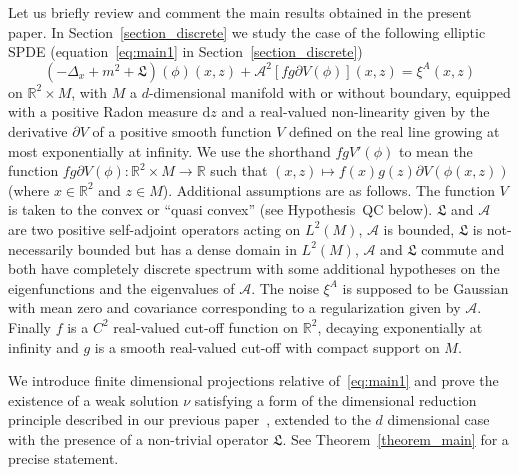 \documentclass[a4paper,10pt]{article}
\newcommand{\mathd}{\mathrm{d}}
\begin{document}
Let us briefly review and comment the main results obtained in the present
paper. In Section~\ref{section_discrete} we study the case of the following
elliptic SPDE (equation~{\eqref{eq:main1}} in Section~\ref{section_discrete})
\[ (- \Delta_x + m^2 + \mathfrak{L}) (\phi) (x, z) + \mathcal{A}^2 [f g
   \partial V (\phi)] (x, z) = \xi^A (x, z) \]
on $\mathbb{R}^2 \times M$, with $M$ a $d$-dimensional manifold with or
without boundary, equipped with a positive Radon measure $\mathd z$ and a
real-valued non-linearity given by the derivative $\partial V$ of a positive smooth
function $V$ defined on the real line growing at most exponentially at
infinity. We use the shorthand $f g V'(\phi)$ to mean the function $f g \partial V(\phi): \mathbb{R}^2\times M  \longrightarrow  \mathbb{R}$ such that $ (x, z) \longmapsto f (x) g (z) \partial V
(\phi (x, z)) $ (where $x\in \mathbb{R}^2$ and $z\in M$).
%
 Additional assumptions are as follows. The function $V$ is
taken to the convex or ``quasi convex'' (see Hypothesis~QC below).
$\mathfrak{L}$ and $\mathcal{A}$ are two positive self-adjoint operators
acting on $L^2 (M)$, $\mathcal{A}$ is bounded, $\mathfrak{L}$ is
not-necessarily bounded but has a dense domain in $L^2 (M)$, $\mathcal{A}$ and
$\mathfrak{L}$ commute and both have completely discrete spectrum with some
additional hypotheses on the eigenfunctions and the eigenvalues of
$\mathcal{A}$. The noise $\xi^A$ is supposed to be Gaussian with mean zero and
covariance corresponding to a regularization given by $\mathcal{A}$. Finally
$f$ is a $C^2$ real-valued cut-off function on $\mathbb{R}^2$, decaying
exponentially at infinity and $g$ is a smooth real-valued cut-off with compact
support on $M$.

We introduce finite dimensional projections relative of~{\eqref{eq:main1}}
and prove the existence of a weak solution $\nu$ satisfying a form of the
dimensional reduction principle described in our previous
paper~{\cite{Albeverio2018elliptic}}, extended to the $d$ dimensional case
with the presence of a non-trivial operator $\mathfrak{L}$. See
Theorem~\ref{theorem_main} for a precise statement.
\end{document}
